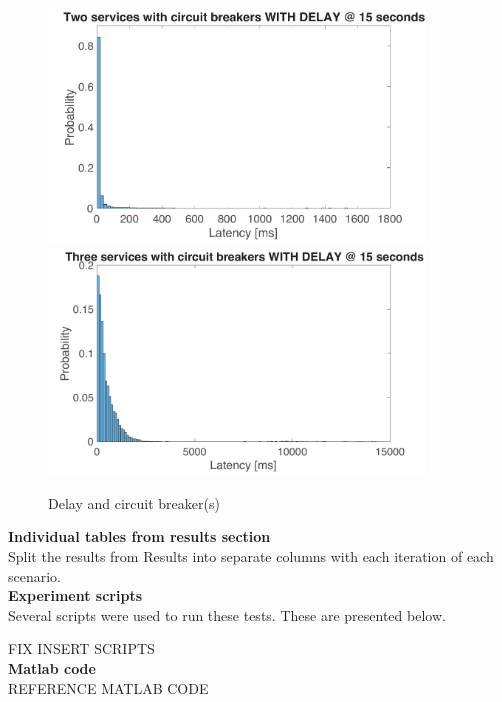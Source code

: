 \begin{figure}[H]
\centering
\includegraphics[width=10cm]{figures/appendix/cb_2svc_delay}
\includegraphics[width=10cm]{figures/appendix/twocb_3svc_delay}
\caption{Delay and circuit breaker(s)}
\end{figure} 


\noindent \textbf{Individual tables from results section} \\
Split the results from Results into separate columns with each iteration of each scenario. \\

\noindent \textbf{Experiment scripts} \\
Several scripts were used to run these tests. These are presented below.

\noindent
FIX INSERT SCRIPTS \\

\noindent \textbf{Matlab code} \\
REFERENCE MATLAB CODE






